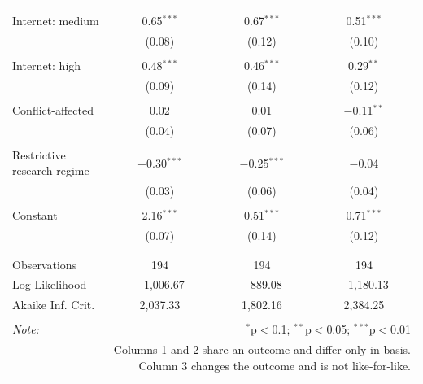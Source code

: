 \begin{table}[!htbp]
\begin{tabular}{@{\extracolsep{5pt}}lccc}
  & & & \\ 
 Internet: medium & 0.65$^{***}$ & 0.67$^{***}$ & 0.51$^{***}$ \\ 
  & (0.08) & (0.12) & (0.10) \\ 
  & & & \\ 
 Internet: high & 0.48$^{***}$ & 0.46$^{***}$ & 0.29$^{**}$ \\ 
  & (0.09) & (0.14) & (0.12) \\ 
  & & & \\ 
 Conflict-affected & 0.02 & 0.01 & $-$0.11$^{**}$ \\ 
  & (0.04) & (0.07) & (0.06) \\ 
  & & & \\ 
 Restrictive research regime & $-$0.30$^{***}$ & $-$0.25$^{***}$ & $-$0.04 \\ 
  & (0.03) & (0.06) & (0.04) \\ 
  & & & \\ 
 Constant & 2.16$^{***}$ & 0.51$^{***}$ & 0.71$^{***}$ \\ 
  & (0.07) & (0.14) & (0.12) \\ 
  & & & \\ 
\hline \\[-1.8ex] 
Observations & 194 & 194 & 194 \\ 
Log Likelihood & $-$1,006.67 & $-$889.08 & $-$1,180.13 \\ 
Akaike Inf. Crit. & 2,037.33 & 1,802.16 & 2,384.25 \\ 
\hline 
\hline \\[-1.8ex] 
\textit{Note:}  & \multicolumn{3}{r}{$^{*}$p$<$0.1; $^{**}$p$<$0.05; $^{***}$p$<$0.01} \\ 
 & \multicolumn{3}{r}{Columns 1 and 2 share an outcome and differ only in basis. Column 3 changes the outcome and is not like-for-like.} \\ 
\end{tabular} 
\end{table} 

